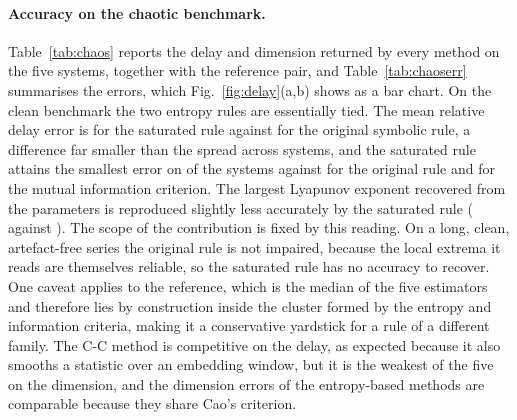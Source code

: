 \documentclass[10pt,a4paper,twocolumn]{article}
\begin{document}
\paragraph{Accuracy on the chaotic benchmark.}
Table~\ref{tab:chaos} reports the delay and dimension returned by every
method on the five systems, together with the reference pair, and
Table~\ref{tab:chaoserr} summarises the errors, which Fig.~\ref{fig:delay}(a,b)
shows as a bar chart.  On the clean benchmark the two entropy rules are
essentially tied.  The mean relative delay error is \chaosTauLPF{} for the
saturated rule against \chaosTauSE{} for the original symbolic rule, a
difference far smaller than the spread across systems, and the saturated rule
attains the smallest error on \chaosWinLPF{} of the \nSystems{} systems against
\chaosWinSE{} for the original rule and \chaosWinMI{} for the mutual
information criterion.  The largest Lyapunov exponent recovered from the
parameters is reproduced slightly less accurately by the saturated rule
(\lleErrLPF{} against \lleErrSE{}).  The scope of the contribution is fixed by
this reading.  On a long, clean, artefact-free series the original rule is not
impaired, because the local extrema it reads are themselves reliable, so the
saturated rule has no accuracy to recover.  One caveat applies to the
reference, which is the median of the five estimators and therefore lies by
construction inside the cluster formed by the entropy and information criteria,
making it a conservative yardstick for a rule of a different family.  The C-C
method is competitive on the delay, as expected because it also smooths a
statistic over an embedding window, but it is the weakest of the five on the
dimension, and the dimension errors of the entropy-based methods are comparable
because they share Cao's criterion.

\begin{table}[t]
\centering
\caption{Reconstructed delay $\tau$ and embedding dimension $m$ for the five
chaotic systems.  The reference pair is the median of the five estimators on
a long clean series.}
\label{tab:chaos}
\scriptsize

\end{table}

\begin{table}[t]
\centering
\caption{Mean relative delay error and mean absolute dimension error of the
five selectors on the chaotic systems.}
\label{tab:chaoserr}
\scriptsize

\end{table}
\end{document}
